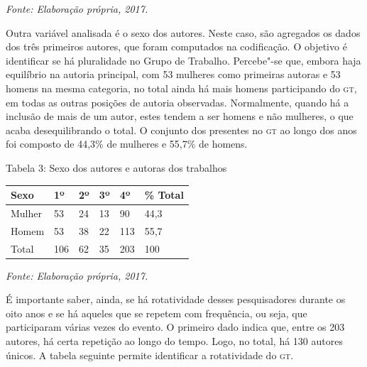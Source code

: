 \begin{center}
{\footnotesize\emph{Fonte: Elaboração própria, 2017.}}
\end{center}

Outra variável analisada é o sexo dos autores. Neste caso, são
agregados os dados dos três primeiros autores, que foram
computados na codificação. O objetivo é identificar se há pluralidade no
Grupo de Trabalho. Percebe"-se que, embora haja equilíbrio na autoria
principal, com 53 mulheres como primeiras autoras e 53 homens na mesma
categoria, no total ainda há mais homens participando do \textsc{gt}, em todas as
outras posições de autoria observadas. Normalmente, quando há a inclusão
de mais de um autor, estes tendem a ser homens e não mulheres, o que
acaba desequilibrando o total. O conjunto dos presentes no \textsc{gt} ao longo
dos anos foi composto de 44,3\% de mulheres e 55,7\% de homens.

\begin{center}
Tabela 3: Sexo dos autores e autoras dos trabalhos
\end{center}

\begin{center}
\centering
\begin{tabular}{|l|l|l|l|l|l|}
\hline
Sexo & 1º & 2º & 3º & 4º & \% Total \\ \hline
Mulher & 53 & 24 & 13 & 90 & 44,3 \\ \hline
Homem & 53 & 38 & 22 & 113 & 55,7 \\ \hline
Total & 106 & 62 & 35 & 203\footnotemark & 100 \\ \hline
\end{tabular}
\end{center}

\begin{center}
{\footnotesize\emph{Fonte: Elaboração própria, 2017.}}
\end{center}


É importante saber, ainda, se há rotatividade desses pesquisadores
durante os oito anos e se há aqueles que se repetem com frequência,
ou seja, que participaram várias vezes do evento. O primeiro dado indica
que, entre os 203 autores, há certa repetição ao longo do tempo.
Logo, no total, há 130 autores únicos. A tabela seguinte permite
identificar a rotatividade do \textsc{gt}.

